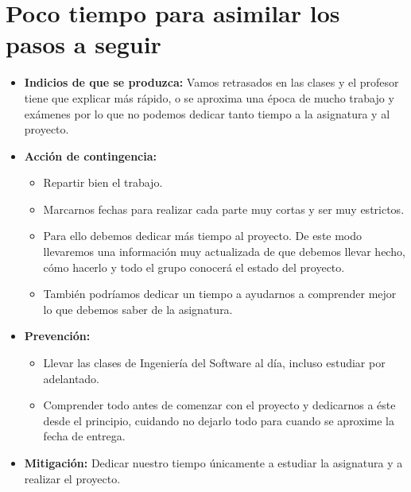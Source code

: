 \documentclass[spanish,a4paper,12pt]{report}	%
\begin{document}
	\section{Poco tiempo para asimilar los pasos a seguir}
		\begin{itemize}
			\item \textbf {Indicios de que se produzca: }Vamos retrasados en las clases y el
			profesor tiene que explicar más rápido, o se aproxima una época de mucho trabajo
			y exámenes por lo que no podemos dedicar tanto tiempo a la asignatura y al
			proyecto.
			\item \textbf {Acción de contingencia: }
				\begin{itemize}
				  \item Repartir bien el trabajo.
				  \item Marcarnos fechas para realizar cada parte muy cortas y ser muy estrictos. 
				  \item Para ello debemos dedicar más tiempo al proyecto. De este modo llevaremos una información
						muy actualizada de que debemos llevar hecho, cómo hacerlo y todo el grupo
						conocerá el estado del proyecto. 
				  \item También podríamos dedicar un tiempo a ayudarnos
						a comprender mejor lo que debemos saber de la asignatura.
				\end{itemize}
			\item \textbf {Prevención: }
				\begin{itemize}
				  \item Llevar las clases de Ingeniería del Software al día, incluso estudiar por adelantado. 
				  \item Comprender todo antes de comenzar con el
						proyecto y dedicarnos a éste desde el principio, cuidando no dejarlo todo para
						cuando se aproxime la fecha de entrega.  %
				\end{itemize}
			\item \textbf {Mitigación: }Dedicar nuestro tiempo únicamente a estudiar la
			asignatura y a realizar el proyecto.
		\end{itemize}

	
\end{document}
